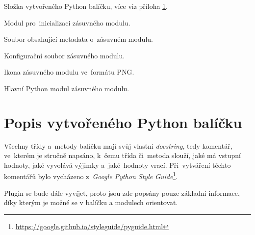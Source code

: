 \begin{description}
\begin{description}[leftmargin=1cm]
\begin{description}[leftmargin=1cm]
		\end{description}
	\end{description}
	\item[\texttt{pubin}:] Složka vytvořeného Python balíčku, více viz příloha \ref{popis_python_balicku}.
	\item[\texttt{\detokenize{__init__.py}}:] Modul pro~inicializaci zásuvného modulu.
	\item[\texttt{metadata.txt}:] Soubor obsahující metadata o~zásuvném modulu.
	\item[\texttt{puplugin.cfg}:] Konfigurační soubor zásuvného modulu.
	\item[\texttt{puplugin.png}:] Ikona zásuvného modulu ve~formátu PNG.
	\item[\texttt{puplugin.py}:] Hlavní Python modul zásuvného modulu.
\end{description}

\chapter{Popis vytvořeného Python balíčku}
\label{popis_python_balicku}

Všechny třídy a~metody balíčku mají svůj vlastní \textit{docstring}, tedy komentář, ve~kterém je stručně napsáno, k~čemu třída či~metoda slouží, jaké má vstupní hodnoty, jaké vyvolává výjimky a~jaké~hodnoty vrací. Při~vytváření těchto komentářů bylo vycházeno z~\textit{Google Python Style Guide}\footnote{\url{https://google.github.io/styleguide/pyguide.html}}.

Plugin se bude dále vyvíjet, proto jsou zde popsány pouze základní informace, díky kterým je možné se v balíčku a modulech orientovat.

\bigskip

\begin{minipage}{0.9\textwidth}
\end{minipage}

